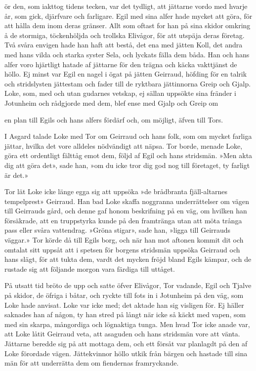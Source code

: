 
\dropcapF ör den, som iakttog tidens tecken, var det tydligt, att jättarne vordo
med hvarje år, som gick, djärfvare och farligare. Egil med sina alfer
hade mycket att göra, för att hålla dem inom deras gränser. Allt som
oftast for han på sina skidor omkring å de stormiga, töckenhöljda och
trollska Elivågor, för att utspäja deras företag. Två svåra envigen hade
han haft att bestå, det ena med jätten Koll, det andra med hans vilda
och starka syster Sela, och lyckats fälla dem båda. Han och hans alfer
voro hjärtligt hatade af jättarne för den trägna och käcka vakttjänst de
höllo. Ej minst var Egil en nagel i ögat på jätten Geirraud, höfding för
en talrik och stridslysten jättestam och fader till de ryktbara
jättinnorna Greip och Gjalp. Loke, som, med och utan gudarnes vetskap,
ej sällan uppsökte sina fränder i Jotunheim och rådgjorde med dem, blef
ense med Gjalp och Greip om

en plan till Egils och hans alfers fördärf och, om möjligt, äfven till
Tors.

I Asgard talade Loke med Tor om Geirraud och hans folk, som om mycket
farliga jättar, hvilka det vore alldeles nödvändigt att näpsa. Tor
borde, menade Loke, göra ett ordentligt fälttåg emot dem, följd af Egil
och hans stridsmän. »Men akta dig att göra det», sade han, »om du icke
tror dig god nog till företaget, ty farligt är det.»

Tor lät Loke icke länge egga sig att uppsöka »de brådbranta
fjäll-altarnes tempelprest» Geirraud. Han bad Loke skaffa noggranna
underrättelser om vägen till Geirrauds gård, och denne gaf honom
beskrifning på en väg, om hvilken han försäkrade, att en truppstyrka
kunde på den framtränga utan att möta trånga pass eller svåra
vattendrag. »Gröna stigar», sade han, »ligga till Geirrauds väggar.» Tor
körde då till Egils borg, och när han mot aftonen kommit dit och omtalat
sitt uppsåt att i spetsen för borgens stridsmän uppsöka Geirraud och
hans slägt, för att tukta dem, vardt det mycken fröjd bland Egils
kämpar, och de rustade sig att följande morgon vara färdiga till
uttåget.

På utsatt tid bröto de upp och satte öfver Elivågor, Tor vadande, Egil
och Tjalve på skidor, de öfriga i båtar, och ryckte till fots in i
Jotunheim på den väg, som Loke hade anvisat. Loke var icke med; det
aktade han sig visligen för. Ej häller saknades han af någon, ty han
stred på långt när icke så käckt med vapen, som med sin skarpa,
mångordiga och lögnaktiga tunga. Men hvad Tor icke anade var, att Loke
låtit Geirraud veta, att asaguden och hans stridsmän vore att vänta.
Jättarne beredde sig på att mottaga dem, och ett försåt var planlagdt på
den af Loke förordade vägen. Jättekvinnor höllo utkik från bärgen och
hastade till sina män för att underrätta dem om fiendernas framryckande.

